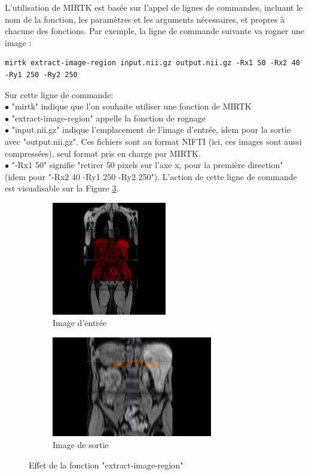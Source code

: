 \documentclass[10pt]{report}
\begin{document}
	L'utilisation de MIRTK est basée sur l'appel de lignes de commandes, incluant le nom de la fonction, les paramètres et les arguments nécessaires, et propres à chacune des fonctions. Par exemple, la ligne de commande suivante va rogner une image :
	\begin{lstlisting}
mirtk extract-image-region input.nii.gz output.nii.gz -Rx1 50 -Rx2 40 -Ry1 250 -Ry2 250
	\end{lstlisting}
	Sur cette ligne de commande:
	\\{$\bullet$} "mirtk" indique que l'on souhaite utiliser une fonction de MIRTK
	\\{$\bullet$} "extract-image-region" appelle la fonction de rognage
	\\{$\bullet$} "input.nii.gz" indique l'emplacement de l'image d'entrée, idem pour la sortie avec "output.nii.gz". Ces fichiers sont au format NIFTI (ici, ces images sont aussi compressées), seul format pris en charge par MIRTK.
	\\{$\bullet$} "-Rx1 50" signifie "retirer 50 pixels sur l'axe x, pour la première direction" (idem pour "-Rx2 40 -Ry1 250 -Ry2 250"). 
	L'action de cette ligne de commande est visualisable sur la Figure \ref{Effet de la fonction "extract-image-region"}.
	\begin{figure}[h!]
		\centering
		\begin{subfigure}{.5\textwidth}
			\centering
			\includegraphics[width=5cm]{Reports/figures/mirtkextractregion1d.png}
			\caption{Image d'entrée}
			\label{Image d'entrée}
		\end{subfigure}%
		\begin{subfigure}{.5\textwidth}
			\centering
			\includegraphics[width=7cm]{Reports/figures/mirtkextractregion2_1d.png}
			\caption{Image de sortie}
			\label{Image de sortie}
		\end{subfigure}
		\caption{Effet de la fonction "extract-image-region"}
		\label{Effet de la fonction "extract-image-region"}
	\end{figure}~\par
\end{document}
